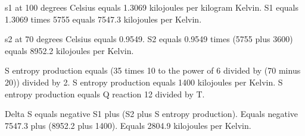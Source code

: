 s1 at 100 degrees Celsius equals 1.3069 kilojoules per kilogram Kelvin.  
S1 equals 1.3069 times 5755 equals 7547.3 kilojoules per Kelvin.  

s2 at 70 degrees Celsius equals 0.9549.  
S2 equals 0.9549 times (5755 plus 3600) equals 8952.2 kilojoules per Kelvin.  

S entropy production equals (35 times 10 to the power of 6 divided by (70 minus 20)) divided by 2.  
S entropy production equals 1400 kilojoules per Kelvin.  
S entropy production equals Q reaction 12 divided by T.  

Delta S equals negative S1 plus (S2 plus S entropy production).  
Equals negative 7547.3 plus (8952.2 plus 1400).  
Equals 2804.9 kilojoules per Kelvin.